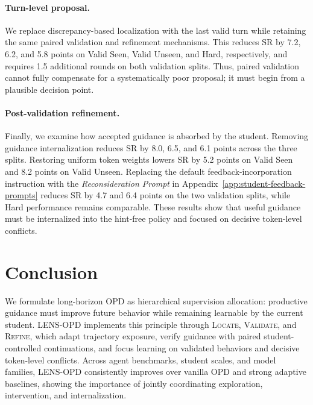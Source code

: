 \documentclass{article}
\begin{document}
\paragraph{Turn-level proposal.}
We replace discrepancy-based localization with the last valid turn while retaining the same paired
validation and refinement mechanisms.  This reduces SR by 7.2, 6.2, and 5.8 points on Valid Seen,
Valid Unseen, and Hard, respectively, and requires 1.5 additional rounds on both validation splits.
Thus, paired validation cannot fully compensate for a systematically poor proposal; it must begin
from a plausible decision point.

\paragraph{Post-validation refinement.}
Finally, we examine how accepted guidance is absorbed by the student.  Removing guidance
internalization reduces SR by 8.0, 6.5, and 6.1 points across the three splits.  Restoring uniform
token weights lowers SR by 5.2 points on Valid Seen and 8.2 points on Valid Unseen.  Replacing the
default feedback-incorporation instruction with the \emph{Reconsideration Prompt} in
Appendix~\ref{app:student-feedback-prompts} reduces SR by 4.7 and 6.4 points on the two validation
splits, while Hard performance remains comparable.  These results show that useful guidance must be
internalized into the hint-free policy and focused on decisive token-level conflicts.

\section{Conclusion}
\label{sec:conclusion}

We formulate long-horizon OPD as hierarchical supervision allocation: productive guidance must
improve future behavior while remaining learnable by the current student.  LENS-OPD implements this
principle through \textsc{Locate}, \textsc{Validate}, and \textsc{Refine}, which adapt trajectory
exposure, verify guidance with paired student-controlled continuations, and focus learning on
validated behaviors and decisive token-level conflicts.  Across agent benchmarks, student scales,
and model families, LENS-OPD consistently improves over vanilla OPD and strong adaptive baselines,
showing the importance of jointly coordinating exploration, intervention, and internalization.



\end{document}
